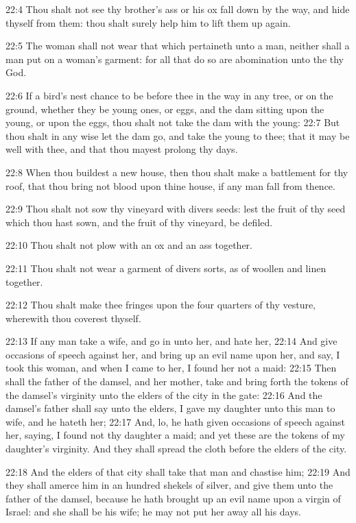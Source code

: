 22:4 Thou shalt not see thy brother's ass or his ox fall down by the way, and hide thyself from them: thou shalt surely help him to lift them up again.

22:5 The woman shall not wear that which pertaineth unto a man, neither shall a man put on a woman's garment: for all that do so are abomination unto the \LORD thy God.

22:6 If a bird's nest chance to be before thee in the way in any tree, or on the ground, whether they be young ones, or eggs, and the dam sitting upon the young, or upon the eggs, thou shalt not take the dam with the young: 22:7 But thou shalt in any wise let the dam go, and take the young to thee; that it may be well with thee, and that thou mayest prolong thy days.

22:8 When thou buildest a new house, then thou shalt make a battlement for thy roof, that thou bring not blood upon thine house, if any man fall from thence.

22:9 Thou shalt not sow thy vineyard with divers seeds: lest the fruit of thy seed which thou hast sown, and the fruit of thy vineyard, be defiled.

22:10 Thou shalt not plow with an ox and an ass together.

22:11 Thou shalt not wear a garment of divers sorts, as of woollen and linen together.

22:12 Thou shalt make thee fringes upon the four quarters of thy vesture, wherewith thou coverest thyself.

22:13 If any man take a wife, and go in unto her, and hate her, 22:14 And give occasions of speech against her, and bring up an evil name upon her, and say, I took this woman, and when I came to her, I found her not a maid: 22:15 Then shall the father of the damsel, and her mother, take and bring forth the tokens of the damsel's virginity unto the elders of the city in the gate: 22:16 And the damsel's father shall say unto the elders, I gave my daughter unto this man to wife, and he hateth her; 22:17 And, lo, he hath given occasions of speech against her, saying, I found not thy daughter a maid; and yet these are the tokens of my daughter's virginity. And they shall spread the cloth before the elders of the city.

22:18 And the elders of that city shall take that man and chastise him; 22:19 And they shall amerce him in an hundred shekels of silver, and give them unto the father of the damsel, because he hath brought up an evil name upon a virgin of Israel: and she shall be his wife; he may not put her away all his days.

